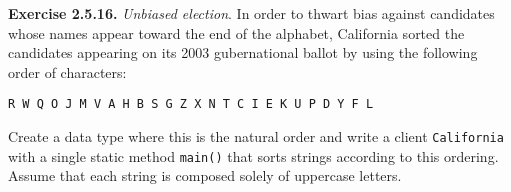 \documentclass[12pt, a4paper]{article}
\newenvironment{ex}[2][Exercise]
{\par\medskip\noindent \textbf{#1 #2.}}
{\medskip}
\begin{document}
	\begin{ex}{2.5.16}
		\emph{Unbiased election}. In order to thwart bias against candidates whose
		names appear toward the end of the alphabet, California sorted the candidates
		appearing on its 2003 gubernational ballot by using the following order of
		characters:
		\begin{lstlisting}[language={}]
		R W Q O J M V A H B S G Z X N T C I E K U P D Y F L
		\end{lstlisting}
	\end{ex}
	Create a data type where this is the natural order and write a client \texttt{California}
	with a single static method \texttt{main()} that sorts strings according to this
	ordering. Assume that each string is composed solely of uppercase letters.
	\pagebreak
	\printbibliography
\end{document}
